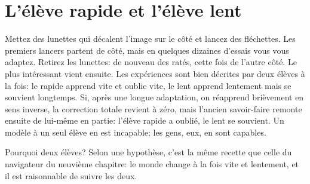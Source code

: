 \section*{L'élève rapide et l'élève lent}

Mettez des lunettes qui décalent l'image sur le côté et lancez des fléchettes. Les premiers lancers partent de côté, mais en quelques dizaines d'essais vous vous adaptez. Retirez les lunettes: de nouveau des ratés, cette fois de l'autre côté. Le plus intéressant vient ensuite. Les expériences sont bien décrites par deux élèves à la fois: le rapide apprend vite et oublie vite, le lent apprend lentement mais se souvient longtemps. Si, après une longue adaptation, on réapprend brièvement en sens inverse, la correction totale revient à zéro, mais l'ancien savoir-faire remonte ensuite de lui-même en partie: l'élève rapide a oublié, le lent se souvient. Un modèle à un seul élève en est incapable; les gens, eux, en sont capables.


Pourquoi deux élèves? Selon une hypothèse, c'est la même recette que celle du navigateur du neuvième chapitre: le monde change à la fois vite et lentement, et il est raisonnable de suivre les deux.

